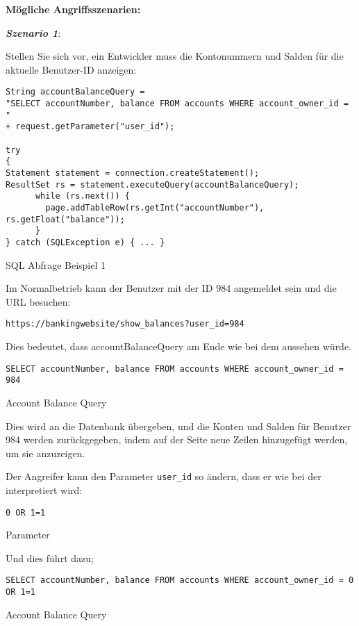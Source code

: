 \textbf{Mögliche Angriffsszenarien:}

\textbf{\textit{Szenario 1}}\cite{vcinj16}:

Stellen Sie sich vor, ein Entwickler muss die Kontonummern und Salden für die aktuelle Benutzer-ID anzeigen:


\begin{Listing}[h]
	\begin{lstlisting}
String accountBalanceQuery = 
"SELECT accountNumber, balance FROM accounts WHERE account_owner_id = " 
+ request.getParameter("user_id");

try
{
Statement statement = connection.createStatement();
ResultSet rs = statement.executeQuery(accountBalanceQuery);
	  while (rs.next()) {
		page.addTableRow(rs.getInt("accountNumber"), rs.getFloat("balance"));
	  }
} catch (SQLException e) { ... }
	\end{lstlisting}
	\caption{SQL Abfrage Beispiel 1}
	\label{lst:inj1}
\end{Listing}

Im Normalbetrieb kann der Benutzer mit der ID 984 angemeldet sein und die URL besuchen:

\texttt{https://bankingwebsite/show\_balances?user\_id=984}

Dies bedeutet, dass accountBalanceQuery am Ende wie bei dem  aussehen würde.

\begin{Listing}[h]
	\begin{lstlisting}
SELECT accountNumber, balance FROM accounts WHERE account_owner_id = 984
	\end{lstlisting}
	\caption{Account Balance Query}
	\label{lst:inj2}
\end{Listing}

Dies wird an die Datenbank übergeben, und die Konten und Salden für Benutzer 984 werden zurückgegeben, indem auf der Seite neue Zeilen hinzugefügt werden, um sie anzuzeigen.

Der Angreifer kann den Parameter \texttt{user\_id} so ändern, dass er wie bei der  interpretiert wird:

\begin{Listing}[h]
	\begin{lstlisting}
0 OR 1=1
	\end{lstlisting}
	\caption{Parameter}
	\label{lst:inj3}
\end{Listing}

Und dies führt dazu;

\begin{Listing}[h]
	\begin{lstlisting}
SELECT accountNumber, balance FROM accounts WHERE account_owner_id = 0 OR 1=1
	\end{lstlisting}
	\caption{Account Balance Query}
	\label{lst:inj4}
\end{Listing}

